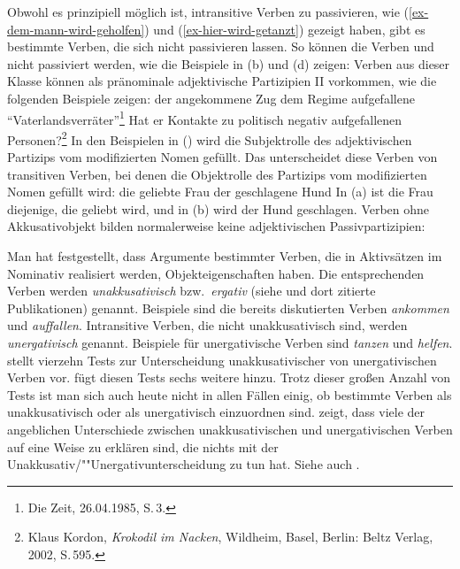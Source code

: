 
Obwohl es prinzipiell möglich ist, intransitive Verben zu passivieren, wie
(\ref{ex-dem-mann-wird-geholfen}) und (\ref{ex-hier-wird-getanzt}) gezeigt haben,
gibt es bestimmte Verben, die sich nicht passivieren lassen.
So können die Verben  und   nicht passiviert werden,
wie die Beispiele in (b) und (d) zeigen:
\eal
\label{ex-passive-erg}
\zl
{}%
Verben aus dieser Klasse können als pränominale adjektivische Partizipien II vorkommen,
wie die folgenden Beispiele zeigen:
\eal
\label{ex-prenominal-erg}
\ex 
der angekommene Zug
\ex
dem Regime aufgefallene "`Vaterlandsverräter"'\footnote{
        Die Zeit, 26.04.1985, S.\,3.%
}
\ex Hat er Kontakte zu politisch negativ aufgefallenen Personen?\footnote{
   Klaus Kordon, \emph{Krokodil im Nacken}, Wildheim, Basel, Berlin: Beltz Verlag, 2002, S.\,595.%
}
\zl
In den Beispielen in () wird die Subjektrolle des adjektivischen Partizips vom
modifizierten Nomen gefüllt. Das unterscheidet diese Verben von transitiven Verben,
bei denen die Objektrolle des Partizips vom modifizierten Nomen gefüllt wird:
\eal
\ex die geliebte Frau
\ex der geschlagene Hund
\zl
In (a) ist die Frau diejenige, die geliebt wird, und in (b)
wird der Hund geschlagen. Verben ohne Akkusativobjekt bilden normalerweise
keine adjektivischen Passivpartizipien:
\eal
\label{ex-prenominal-nerg}
\zl

\noindent
Man hat festgestellt, dass Argumente bestimmter Verben, die in Aktivsätzen im Nominativ realisiert
werden, Objekteigenschaften haben. Die entsprechenden Verben werden \emph{unakkusativisch}
\citep{Perlmutter78} bzw.\ \emph{ergativ} (siehe \zb {} und dort
zitierte Publikationen\nocite{Pullum88a}) genannt. Beispiele sind die bereits diskutierten Verben
\emph{ankommen} und \emph{auffallen}. Intransitive Verben, die nicht unakkusativisch sind, werden
\emph{unergativisch} genannt. Beispiele für unergativische Verben sind
\emph{tanzen} und \emph{helfen}. \citet{Grewendorf89a} stellt
vierzehn Tests zur Unterscheidung unakkusativischer von unergativischen Verben vor.
\citet{Fanselow92} fügt diesen Tests sechs weitere hinzu.  Trotz dieser großen Anzahl
von Tests ist man sich auch heute nicht in allen Fällen einig, ob bestimmte Verben als
unakkusativisch oder als unergativisch einzuordnen sind.
\citet{Kaufmann95a}
zeigt, dass viele der angeblichen Unterschiede zwischen unakkusativischen und unergativischen Verben
auf eine Weise zu erklären sind, die nichts mit der Unakkusativ/""Unergativunterscheidung zu tun
hat. Siehe auch .

